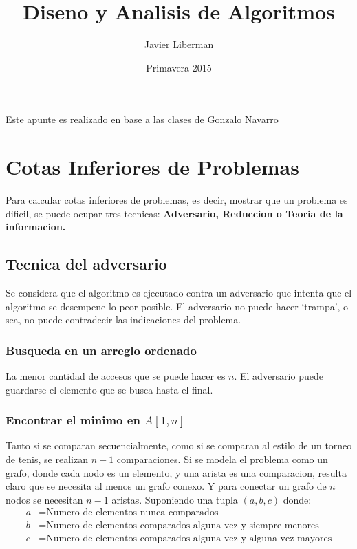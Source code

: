 \documentclass[12pt]{article}
\begin{document}
\title{Diseno y Analisis de Algoritmos}
\author{Javier Liberman}
\date{Primavera 2015}
\maketitle
\begin{center}
Este apunte es realizado en base a las clases de Gonzalo Navarro
\end{center}
\newpage
\section{Cotas Inferiores de Problemas}

Para calcular cotas inferiores de problemas, es decir, mostrar que un problema es dificil, se puede ocupar tres tecnicas: \textbf{Adversario, Reduccion o Teoria de la informacion.}

\subsection {Tecnica del adversario}

Se considera que el algoritmo es ejecutado contra un adversario que intenta que el algoritmo se desempene lo peor posible. El adversario no puede hacer `trampa', o sea, no puede contradecir las indicaciones del problema.

\subsubsection {Busqueda en un arreglo ordenado}

La menor cantidad de accesos que se puede hacer es $n$. El adversario puede guardarse el elemento que se busca hasta el final.

\subsubsection {Encontrar el minimo en $A[1, n]$}

Tanto si se comparan secuencialmente, como si se comparan al estilo de un torneo de tenis, se realizan $n-1$ comparaciones. Si se modela el problema como un grafo, donde cada nodo es un elemento, y una arista es una comparacion, resulta claro que se necesita al menos un grafo conexo. Y para conectar un grafo de $n$ nodos se necesitan $n-1$ aristas.
Suponiendo una tupla $(a,b,c)$ donde:
\begin{align}
a &= \text{Numero de elementos nunca comparados} \\
b &= \text{Numero de elementos comparados alguna vez y siempre menores} \\
c &= \text{Numero de elementos comparados alguna vez y alguna vez mayores}
\end{align}
\end{document}
